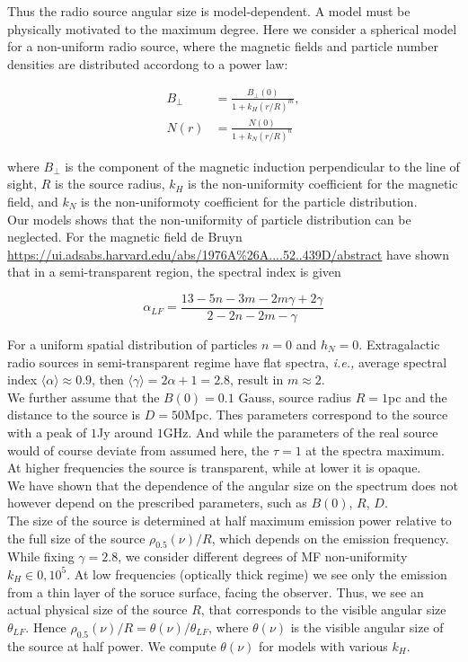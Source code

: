 \documentclass[11pt,a4paper,headinclude=true,DIV=14,BCOR=8mm,chapterprefix,listof=totoc,twoside,openright,abstracton]{scrbook}
\begin{document}
Thus the radio source angular size is model-dependent. A model must be physically motivated to the maximum degree. Here we consider a spherical model for a non-uniform radio source, where the magnetic fields and particle number densities are distributed accordong to a power law:

\begin{align}
    B_{\perp} &= \frac{B_{\perp}(0)}{1 + k_H(r/R)^m},\\
    N(r) &= \frac{N(0)}{1 + k_N(r/R)^n}
\end{align}

where $B_{\perp}$ is the component of the magnetic induction perpendicular to the line of sight, $R$ is the source radius, $k_H$ is the non-uniformity coefficient for the magnetic field, and $k_N$ is the non-uniformoty coefficient for the particle distribution. \\

Our models shows that the non-uniformity of particle distribution can be neglected. For the magnetic field de Bruyn \url{https://ui.adsabs.harvard.edu/abs/1976A\%26A....52..439D/abstract} have shown that in a semi-transparent region, the spectral index is given 

\begin{equation}
    \alpha_{LF} = \frac{13 - 5n - 3m - 2m\gamma + 2\gamma}{2 - 2n - 2m - \gamma}
\end{equation}

For a uniform spatial distribution of particles $n=0$ and $h_N = 0$. Extragalactic radio sources in semi-transparent regime have flat spectra, \textit{i.e.,} average spectral index $\langle\alpha\rangle\approx0.9$, then $\langle\gamma\rangle = 2\alpha+1 = 2.8$, result in $m\approx 2$. \\

We further assume that the $B(0) = 0.1$ Gauss, source radius $R=1$pc and the distance to the source is $D=50$Mpc. Thes parameters correspond to the source with a peak of $1$Jy around $1$GHz. And while the parameters of the real source would of course deviate from assumed here, the $\tau=1$ at the spectra maximum. At higher frequencies the source is transparent, while at lower it is opaque. \\

We have shown that the dependence of the angular size on the spectrum does not however depend on the prescribed parameters, such as $B(0)$, $R$, $D$. \\

The size of the source is determined at half maximum emission power relative to the full size of the source $\rho_{0.5}(\nu)/R$, which depends on the emission frequency. While fixing $\gamma=2.8$, we consider different degrees of MF non-uniformity $k_H\in{0,10^5}$. At low frequencies (optically thick regime) we see only the emission from a thin layer of the soruce surface, facing the observer. Thus, we see an actual physical size of the source $R$, that corresponds to the visible angular size $\theta_{LF}$. Hence $\rho_{0.5}(\nu)/R = \theta(\nu)/\theta_{LF}$, where $\theta(\nu)$ is the visible angular size of the source at half power. We compute $\theta(\nu)$ for models with various $k_H$. \\
\end{document}
